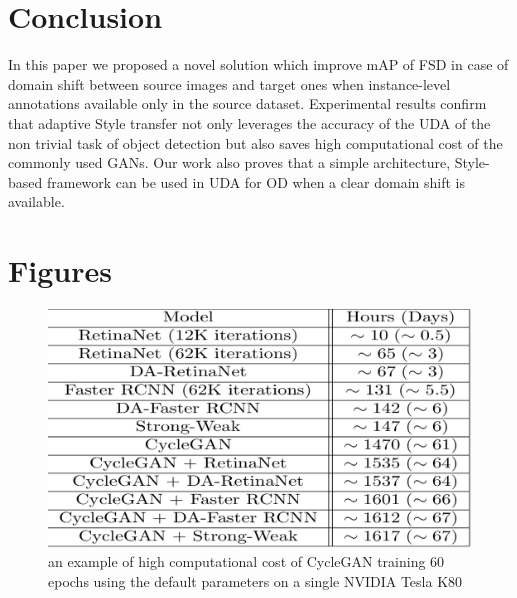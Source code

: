 \documentclass[10pt,twocolumn,letterpaper]{article}
\begin{document}

\section{Conclusion}

In this paper we proposed a novel solution which improve mAP of FSD in case of domain shift between source images and target ones when instance-level annotations available only in the source dataset.
Experimental results confirm that adaptive Style transfer not only leverages the accuracy of the UDA of the non trivial task of object detection but also saves high computational cost of the commonly used GANs. 
Our work also proves that a simple architecture, Style-based framework can be used in UDA for OD when a clear domain shift is available. 

\vfill\null
{\small


}

\appendix
\renewcommand\thefigure{\thesection.\arabic{figure}}    
\section{Figures}
\setcounter{figure}{0}    

\begin{figure}[b]
    \centering
    \includegraphics[width=0.96\linewidth]{Images/cyclegan.png}
    \caption{an example of high computational cost of CycleGAN training 60 epochs using the default parameters on a single NVIDIA Tesla K80}
\label{fig:cost}
\end{figure}
\end{document}
